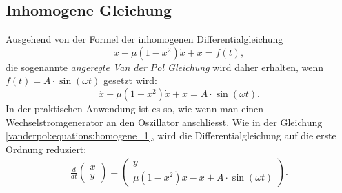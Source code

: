 \subsection{Inhomogene Gleichung}
\label{vanderpol:subsection:inhomogene}
Ausgehend von der Formel der inhomogenen Differentialgleichung
\begin{equation*}
	\ddot{x}-\mu(1-x^{2}) \dot{x}+x = f(t),
\label{vanderpol:equations:inhomogene_gen}
\end{equation*}
die sogenannte {\em angeregte Van der Pol Gleichung} wird daher erhalten, wenn $f(t) = A \cdot \sin(\omega t)$ gesetzt wird:
\begin{equation}
	\ddot{x}-\mu(1-x^{2}) \dot{x}+x = A \cdot \sin(\omega t).
\label{vanderpol:equations:inhomogene_sin}
\end{equation}
In der praktischen Anwendung ist es so, wie wenn man einen Wechselstromgenerator an den Oszillator anschliesst. Wie in der Gleichung \eqref{vanderpol:equations:homogene_1}, wird die Differentialgleichung auf die erste Ordnung reduziert:
\begin{align}
\frac{d}{dt}\begin{pmatrix}x \\ y\end{pmatrix} = \begin{pmatrix}y \\ \mu (1-x^{2})\dot{x}-x+A \cdot \sin(\omega t)\end{pmatrix}.
\label{vanderpol:equations:inhomogene_2}
\end{align}